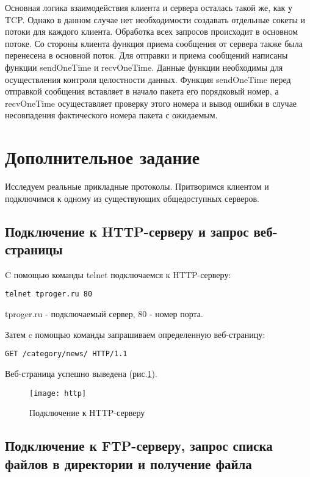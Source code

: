 Основная логика взаимодействия клиента и сервера осталась такой же, как у TCP. Однако в данном случае нет необходимости создавать отдельные сокеты и потоки для каждого клиента. Обработка всех запросов происходит в основном потоке. Со стороны клиента функция приема сообщения от сервера также была перенесена в основной поток. Для отправки и приема сообщений написаны функции sendOneTime и recvOneTime. Данные функции необходимы для осуществления контроля целостности данных. Функция sendOneTime перед отправкой сообщения вставляет в начало пакета его порядковый номер, а recvOneTime осущеставляет проверку этого номера и вывод ошибки в случае несовпадения фактического номера пакета с ожидаемым. 

\section{Дополнительное задание}

Исследуем реальные прикладные протоколы. Притворимся клиентом и подключимся к одному из существующих общедоступных серверов. 

\subsection{Подключение к HTTP-серверу и запрос веб-страницы}

C помощью команды telnet подключаемся к HTTP-серверу:

\begin{lstlisting}
telnet tproger.ru 80
\end{lstlisting}

tproger.ru - подключаемый сервер, 80 - номер порта.

Затем c помощью команды запрашиваем определенную веб-страницу:

\begin{lstlisting}
GET /category/news/ HTTP/1.1
\end{lstlisting}

Веб-страница успешно выведена (рис.\ref{pic:http}).

\begin{figure}[H]
	\begin{center}
		\texttt{[image: http]}
		\caption{Подключение к HTTP-серверу} 
		\label{pic:http} %
	\end{center}
\end{figure}

\subsection{Подключение к FTP-серверу, запрос списка файлов в директории и получение файла}


